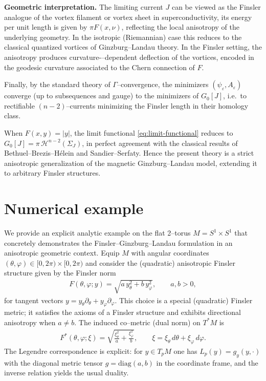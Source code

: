 \documentclass[fleqn,11pt,twoside]{article}
\theoremstyle{definition}
\begin{document}
\medskip
\noindent\textbf{Geometric interpretation.}
The limiting current $J$ can be viewed as the Finsler analogue of the vortex filament or vortex sheet in superconductivity, its energy per unit length is given by $\pi F(x,\nu)$, reflecting the local anisotropy of the underlying geometry. In the isotropic (Riemannian) case this reduces to the classical quantized vortices of Ginzburg--Landau theory. In the Finsler setting, the anisotropy produces curvature-–dependent deflection of the vortices, encoded in the geodesic curvature associated to the Chern connection of $F$.

Finally, by the standard theory of $\Gamma$--convergence, the minimizers $(\psi_\varepsilon, A_\varepsilon)$ converge (up to subsequences and gauge) to the minimizers of $G_0[J]$, i.e.\ to rectifiable $(n-2)$--currents minimizing the Finsler length in their homology class.

When $F(x,y)=|y|$, the limit functional \eqref{eq:limit-functional}
reduces to $G_0[J] = \pi\, \mathcal{H}^{n-2}(\Sigma_J)$,
in perfect agreement with the classical results of Bethuel--Brezis--H\'elein and Sandier--Serfaty. Hence the present theory is a strict anisotropic generalization of the magnetic Ginzburg--Landau model, extending it to arbitrary Finsler
structures.

\section{Numerical example}

We provide an explicit analytic example on the flat 2--torus 
$M = S^1 \times S^1$ that concretely demonstrates the Finsler--Ginzburg--Landau formulation in an anisotropic geometric context. Equip $M$ with angular coordinates $(\theta,\varphi)\in[0,2\pi)\times[0,2\pi)$ and consider the (quadratic) anisotropic Finsler structure given by the Finsler norm
\begin{align*}
F(\theta,\varphi; y)=\sqrt{a\,y_\theta^2 + b\,y_\varphi^2},\qquad a,b>0,
\end{align*}
for tangent vectors $y=y_\theta\partial_\theta+y_\varphi\partial_\varphi$. This choice is a special (quadratic) Finsler metric; it satisfies the axioms of a Finsler structure and exhibits directional anisotropy when $a\neq b$. The induced co–metric (dual norm) on $T^*M$ is
\begin{align*}
F^*(\theta,\varphi;\xi)=\sqrt{\frac{\xi_\theta^2}{a}+\frac{\xi_\varphi^2}{b}},\qquad \xi=\xi_\theta\,d\theta+\xi_\varphi\,d\varphi.
\end{align*}
The Legendre correspondence is explicit: for $y\in T_pM$ one has $L_p(y)=g_y(y,\cdot)$ with the diagonal metric tensor $g=\mathrm{diag}(a,b)$ in the coordinate frame, and the inverse relation yields the usual duality.
\end{document}
